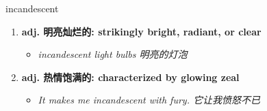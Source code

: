 
\begin{frame}
{\huge incandescent}
\begin{center}
\begin{enumerate}\Large
  \item \textbf{adj. 明亮灿烂的: strikingly bright, radiant, or clear}
  \begin{itemize}
    \item \em{\Large{incandescent light bulbs 明亮的灯泡}}
  \end{itemize}
  \item \textbf{adj. 热情饱满的: characterized by glowing zeal}
  \begin{itemize}
    \item \em{\Large{It makes me incandescent with fury. 它让我愤怒不已}}
  \end{itemize}
\end{enumerate}
\end{center}
\end{frame}
